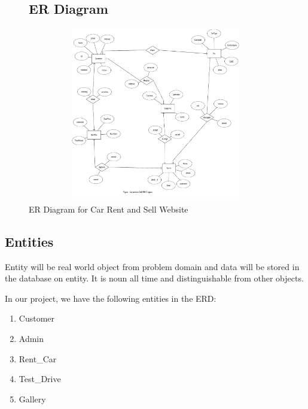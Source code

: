 \begin{figure}

\subsection{ ER Diagram}

\includegraphics*[width=6.3in, height=3in, keepaspectratio=false]{figures/erd}

\caption{ER Diagram for Car Rent and Sell Website}

\end{figure}



\noindent 
\subsection{ Entities}

\noindent Entity will be real world object from problem domain and data will be stored in the database on entity. It is noun all time and distinguishable from other objects.

\noindent In our project, we have the following entities in the ERD:

\begin{enumerate}
\item  Customer

\item  Admin

\item  Rent\_Car

\item  Test\_Drive

\item  Gallery

\end{enumerate}

